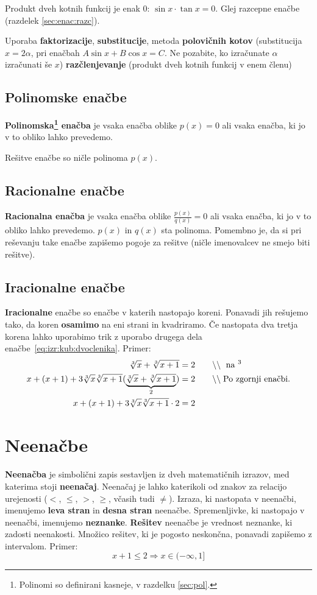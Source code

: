 \documentclass[a4paper,oneside,12pt,fleqn]{article}
\makeatletter
\newcommand\krat\cdot
\newcommand{\comment}[1]{\ensuremath{\qquad\backslash\backslash\;}\textnormal{#1}}
\newcommand{\hyperanchor}[1]{\Hy@raisedlink{\hypertarget{#1}{}}}
\def\kos{\cos}
\renewcommand\implies\Rightarrow
\numberwithin{equation}{section}
\makeatother
\begin{document}
Produkt dveh kotnih funkcij je enak 0: $\sin x \krat \tan x = 0$. Glej razcepne enačbe
(razdelek \ref{sec:enac:razc}).

Uporaba \textbf{faktorizacije}, \textbf{substitucije}, metoda \textbf{polovičnih kotov}
(substitucija $x = 2\alpha$, pri enačbah $A\sin x + B\kos x = C$. Ne pozabite, ko
izračunate $\alpha$ izračunati še $x$) \textbf{razčlenjevanje} (produkt dveh kotnih funkcij v enem členu)

\subsection{Polinomske enačbe}
\label{sec:enac:pol}
\textbf{Polinomska\footnote{Polinomi so definirani kasneje, v razdelku \ref{sec:pol}.}
enačba} je vsaka enačba oblike $p(x) = 0$ ali vsaka enačba, ki jo v to obliko lahko prevedemo. 

Rešitve enačbe so ničle polinoma $p(x)$.

\subsection{Racionalne enačbe}
\label{sec:enac:rac}
\textbf{Racionalna enačba} je vsaka enačba oblike $\frac{p(x)}{q(x)} = 0$ ali vsaka enačba, ki jo
v to obliko lahko prevedemo. $p(x)$ in $q(x)$ sta polinoma.
Pomembno je, da si pri reševanju take enačbe zapišemo pogoje
za rešitve (ničle imenovalcev ne smejo biti rešitve).

\subsection{Iracionalne enačbe}
\textbf{Iracionalne} enačbe so enačbe v katerih nastopajo koreni. Ponavadi jih rešujemo
tako, da koren \textbf{osamimo} na eni strani in kvadriramo. Če nastopata dva tretja korena lahko
uporabimo trik z uporabo drugega dela enačbe~\ref{eq:izr:kub:dvoclenika}. Primer:
\begin{align*}
  \sqrt[3]{x} + \sqrt[3]{x+1} &= 2  \comment{ na $^3$} \\
  x + (x+1) + 3\sqrt[3]{x}\sqrt[3]{x+1}(\underbrace{\sqrt[3]{x} + \sqrt[3]{x+1}}_{2}) &=  2
  \comment{Po zgornji enačbi.} \\
  x + (x+1) + 3\sqrt[3]{x}\sqrt[3]{x+1} \krat 2 &= 2
\end{align*}


\section{Neenačbe}
\label{sec:neenac}
\textbf{Neenačba} je simbolični zapis sestavljen iz dveh matematičnih
izrazov, med katerima stoji \textbf{neenačaj}. \hyperanchor{point:neenacaj}
Neenačaj je lahko katerikoli od znakov za relacijo
urejenosti ($<$, $\leq$, $>$, $\geq$, včasih tudi $\neq$). Izraza, ki nastopata v neenačbi,
imenujemo \textbf{leva stran} in \textbf{desna stran} neenačbe.
Spremenljivke, ki nastopajo v neenačbi, imenujemo \textbf{neznanke}.
\textbf{Rešitev} neenačbe je vrednost neznanke, ki zadosti neenakosti. 
Množico rešitev, ki je pogosto neskončna, ponavadi zapišemo z intervalom.
Primer:
\[ x + 1 \leq 2 \implies x \in (-\infty, 1] \]
\end{document}
